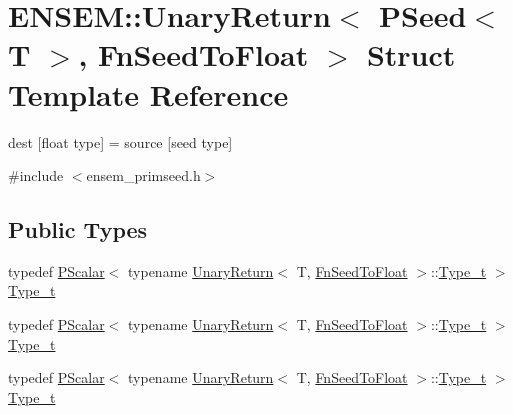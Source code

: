 \hypertarget{structENSEM_1_1UnaryReturn_3_01PSeed_3_01T_01_4_00_01FnSeedToFloat_01_4}{}\section{E\+N\+S\+EM\+:\+:Unary\+Return$<$ P\+Seed$<$ T $>$, Fn\+Seed\+To\+Float $>$ Struct Template Reference}
\label{structENSEM_1_1UnaryReturn_3_01PSeed_3_01T_01_4_00_01FnSeedToFloat_01_4}


dest \mbox{[}float type\mbox{]} = source \mbox{[}seed type\mbox{]}  




{\ttfamily \#include $<$ensem\+\_\+primseed.\+h$>$}

\subsection*{Public Types}
\begin{DoxyCompactItemize}
\item 
typedef \mbox{\hyperlink{classENSEM_1_1PScalar}{P\+Scalar}}$<$ typename \mbox{\hyperlink{structENSEM_1_1UnaryReturn}{Unary\+Return}}$<$ T, \mbox{\hyperlink{structENSEM_1_1FnSeedToFloat}{Fn\+Seed\+To\+Float}} $>$\+::\mbox{\hyperlink{structENSEM_1_1UnaryReturn_3_01PSeed_3_01T_01_4_00_01FnSeedToFloat_01_4_a0162324945d4cff5d69aa1ee87641522}{Type\+\_\+t}} $>$ \mbox{\hyperlink{structENSEM_1_1UnaryReturn_3_01PSeed_3_01T_01_4_00_01FnSeedToFloat_01_4_a0162324945d4cff5d69aa1ee87641522}{Type\+\_\+t}}
\item 
typedef \mbox{\hyperlink{classENSEM_1_1PScalar}{P\+Scalar}}$<$ typename \mbox{\hyperlink{structENSEM_1_1UnaryReturn}{Unary\+Return}}$<$ T, \mbox{\hyperlink{structENSEM_1_1FnSeedToFloat}{Fn\+Seed\+To\+Float}} $>$\+::\mbox{\hyperlink{structENSEM_1_1UnaryReturn_3_01PSeed_3_01T_01_4_00_01FnSeedToFloat_01_4_a0162324945d4cff5d69aa1ee87641522}{Type\+\_\+t}} $>$ \mbox{\hyperlink{structENSEM_1_1UnaryReturn_3_01PSeed_3_01T_01_4_00_01FnSeedToFloat_01_4_a0162324945d4cff5d69aa1ee87641522}{Type\+\_\+t}}
\item 
typedef \mbox{\hyperlink{classENSEM_1_1PScalar}{P\+Scalar}}$<$ typename \mbox{\hyperlink{structENSEM_1_1UnaryReturn}{Unary\+Return}}$<$ T, \mbox{\hyperlink{structENSEM_1_1FnSeedToFloat}{Fn\+Seed\+To\+Float}} $>$\+::\mbox{\hyperlink{structENSEM_1_1UnaryReturn_3_01PSeed_3_01T_01_4_00_01FnSeedToFloat_01_4_a0162324945d4cff5d69aa1ee87641522}{Type\+\_\+t}} $>$ \mbox{\hyperlink{structENSEM_1_1UnaryReturn_3_01PSeed_3_01T_01_4_00_01FnSeedToFloat_01_4_a0162324945d4cff5d69aa1ee87641522}{Type\+\_\+t}}
\end{DoxyCompactItemize}


